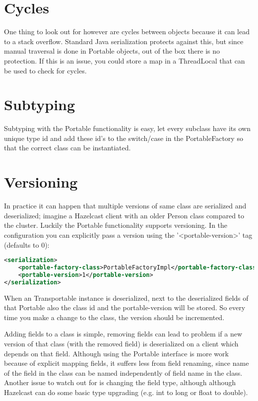 \section{Cycles}
One thing to look out for however are cycles between objects because it can lead to a stack overflow. Standard Java serialization protects against this, but since manual traversal is done in Portable objects, out of the box there is no protection. If this is an issue, you could store a map in a ThreadLocal that can be used to check for cycles.

\section{Subtyping}
Subtyping with the Portable functionality is easy, let every subclass have its own unique type id and add these id's to the switch/case in the PortableFactory so that the correct class can be instantiated. 

\section{Versioning}
In practice it can happen that multiple versions of same class are serialized and deserialized; imagine a Hazelcast client with an older Person class compared to the cluster. Luckily the Portable functionality supports versioning. In the configuration you can explicitly pass a version using the '<portable-version>' tag (defaults to 0):
\begin{lstlisting}[language=xml]
<serialization>
    <portable-factory-class>PortableFactoryImpl</portable-factory-class>
    <portable-version>1</portable-version>
</serialization>
\end{lstlisting}
When an Transportable instance is deserialized, next to the deserialized fields of that Portable also the class id and the portable-version will be stored. So every time you make a change to the class, the version should be incremented. 

Adding fields to a class is simple, removing fields can lead to problem if a new version of that class (with the removed field) is deserialized on a client which depends on that field. Although using the Portable interface is more work because of explicit mapping fields, it suffers less from field renaming, since name of the field in the class can be named independently of field name in the class. Another issue to watch out for is changing the field type, although although Hazelcast can do some basic type upgrading (e.g. int to long or float to double). 

